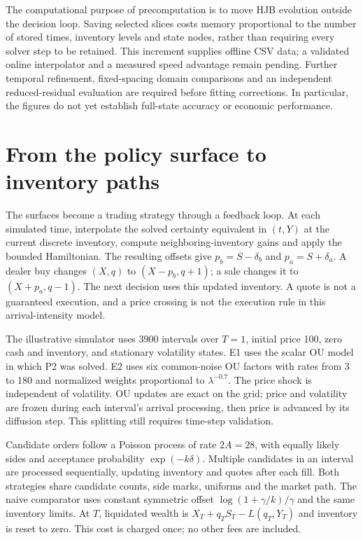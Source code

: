 The computational purpose of precomputation is to move HJB evolution outside the decision loop. Saving selected slices costs memory proportional to the number of stored times, inventory levels and state nodes, rather than requiring every solver step to be retained. This increment supplies offline CSV data; a validated online interpolator and a measured speed advantage remain pending. Further temporal refinement, fixed-spacing domain comparisons and an independent reduced-residual evaluation are required before fitting corrections. In particular, the figures do not yet establish full-state accuracy or economic performance.

\clearpage
\section{From the policy surface to inventory paths}
The surfaces become a trading strategy through a feedback loop. At each simulated time, interpolate the solved certainty equivalent in $(t,Y)$ at the current discrete inventory, compute neighboring-inventory gains and apply the bounded Hamiltonian. The resulting offsets give $p_b=S-\delta_b$ and $p_a=S+\delta_a$. A dealer buy changes $(X,q)$ to $(X-p_b,q+1)$; a sale changes it to $(X+p_a,q-1)$. The next decision uses this updated inventory. A quote is not a guaranteed execution, and a price crossing is not the execution rule in this arrival-intensity model.

The illustrative simulator uses 3900 intervals over $T=1$, initial price 100, zero cash and inventory, and stationary volatility states. E1 uses the scalar OU model in which P2 was solved. E2 uses six common-noise OU factors with rates from 3 to 180 and normalized weights proportional to $\lambda^{-0.7}$. The price shock is independent of volatility. OU updates are exact on the grid; price and volatility are frozen during each interval's arrival processing, then price is advanced by its diffusion step. This splitting still requires time-step validation.

Candidate orders follow a Poisson process of rate $2A=28$, with equally likely sides and acceptance probability $\exp(-k\delta)$. Multiple candidates in an interval are processed sequentially, updating inventory and quotes after each fill. Both strategies share candidate counts, side marks, uniforms and the market path. The naive comparator uses constant symmetric offset $\log(1+\gamma/k)/\gamma$ and the same inventory limits. At $T$, liquidated wealth is $X_T+q_TS_T-L(q_T,Y_T)$ and inventory is reset to zero. This cost is charged once; no other fees are included.

